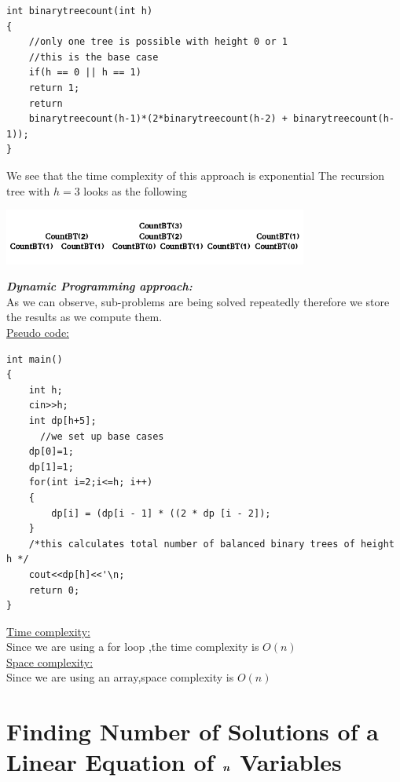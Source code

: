 \documentclass[12pt]{book}
\begin{document}
\begin{lstlisting}
int binarytreecount(int h)
{
    //only one tree is possible with height 0 or 1
    //this is the base case
    if(h == 0 || h == 1)
    return 1;
    return 
    binarytreecount(h-1)*(2*binarytreecount(h-2) + binarytreecount(h-1));
}
\end{lstlisting}

We see that the time complexity of this approach is exponential\newline
The recursion tree with $h = 3$ looks as the following\newline\newline

\begin{center}
    \includegraphics[width = 10cm]{Balanced_Binary_Tree-2.png}    
\end{center}

\textbf{\textit{Dynamic Programming approach:}}\\
As we can observe, sub-problems are being solved repeatedly therefore we store the results as we compute them.\\

\underline{Pseudo code:}\\

\begin{lstlisting}
int main()
{
    int h;
    cin>>h;
    int dp[h+5];
      //we set up base cases
    dp[0]=1;
    dp[1]=1;
    for(int i=2;i<=h; i++)
    {
        dp[i] = (dp[i - 1] * ((2 * dp [i - 2]);
    }
    /*this calculates total number of balanced binary trees of height h */
    cout<<dp[h]<<'\n;
    return 0;
}
\end{lstlisting}

\underline{Time complexity:}\\
Since we are using a for loop ,the time complexity is $O(n)$\\

\underline{Space complexity:}\\
Since we are using an array,space complexity is $O(n)$\\

\chapter{Finding Number of Solutions of a Linear Equation of $\textbf{\textit{n}}$ Variables}
\end{document}
